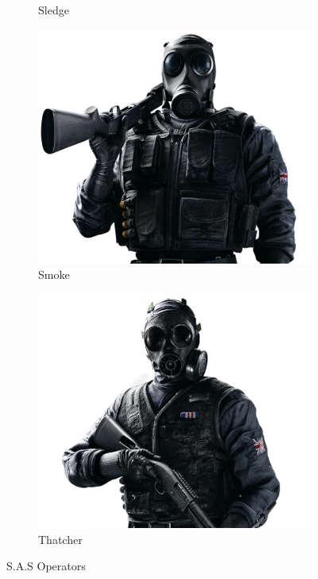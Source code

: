 \documentclass{ctexart}             %
\numberwithin{table}{section}
\numberwithin{figure}{section}
\begin{document}
\begin{figure}
\begin{subfigure}[b]{0.2\textwidth}
        \caption{Sledge}
        \label{fig:sledge}
    \end{subfigure}
    \hfill
    \begin{subfigure}[b]{0.2\textwidth}
        \centering
        \includegraphics[width=\textwidth]{imgs/SAS-Smoke.png}
        \caption{Smoke}
        \label{fig:smoke}
    \end{subfigure}
    \hfill
\begin{subfigure}[b]{0.2\textwidth}
        \centering
        \includegraphics[width=\textwidth]{imgs/SAS-Thatcher.png}
        \caption{Thatcher}
        \label{fig:thatcher}
    \end{subfigure}
    \caption{S.A.S Operators}
    \label{}
\end{figure}
\end{document}
